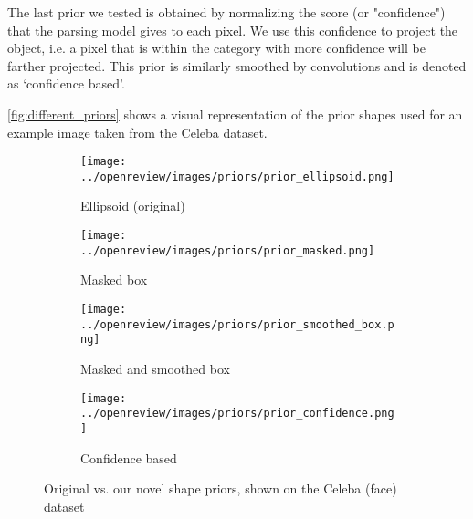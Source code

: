 The last prior we tested is obtained by normalizing the score (or "confidence") that the parsing model gives to each pixel. We use this confidence to project the object, i.e. a pixel that is within the category with more confidence will be farther projected. This prior is similarly smoothed by convolutions and is denoted as `confidence based'. 

\autoref{fig:different_priors} shows a visual representation of the prior shapes used for an example image taken from the Celeba dataset.
\begin{figure}[!htb]
    \centering
    \begin{subfigure}[t]{0.20\textwidth}
        \texttt{[image: ../openreview/images/priors/prior\_ellipsoid.png]}
        \caption{Ellipsoid (original)}
    \end{subfigure}
    \begin{subfigure}[t]{0.20\textwidth}
        \texttt{[image: ../openreview/images/priors/prior\_masked.png]}
        \caption{Masked box}
    \end{subfigure}
    \begin{subfigure}[t]{0.20\textwidth}
        \texttt{[image: ../openreview/images/priors/prior\_smoothed\_box.png]}
        \caption{Masked and  smoothed box
        }
        \label{subfig:c}
    \end{subfigure}
    \begin{subfigure}[t]{0.20\textwidth}
        \texttt{[image: ../openreview/images/priors/prior\_confidence.png]}
        \caption{Confidence based
        }
        \label{subfig:d}
    \end{subfigure}
    \caption{Original vs. our novel shape priors, shown on the Celeba (face) dataset}
    \label{fig:different_priors}
\end{figure}

